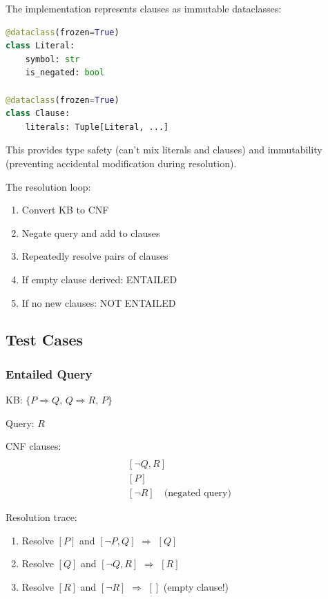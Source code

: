 \documentclass[letterpaper]{article}
\begin{document}
The implementation represents clauses as immutable dataclasses:

\begin{lstlisting}[language=Python]
@dataclass(frozen=True)
class Literal:
    symbol: str
    is_negated: bool

@dataclass(frozen=True)
class Clause:
    literals: Tuple[Literal, ...]
\end{lstlisting}

This provides type safety (can't mix literals and clauses) and immutability (preventing accidental modification during resolution).

The resolution loop:
\begin{enumerate}
\item Convert KB to CNF
\item Negate query and add to clauses
\item Repeatedly resolve pairs of clauses
\item If empty clause derived: ENTAILED
\item If no new clauses: NOT ENTAILED
\end{enumerate}

\subsection{Test Cases}

\subsubsection{Entailed Query}

KB: $\{P \Rightarrow Q, \, Q \Rightarrow R, \, P\}$

Query: $R$

CNF clauses:
\begin{align*}
[\neg P, Q] \\
[\neg Q, R] \\
[P] \\
[\neg R] \quad \text{(negated query)}
\end{align*}

Resolution trace:
\begin{enumerate}
\item Resolve $[P]$ and $[\neg P, Q]$ $\Rightarrow$ $[Q]$
\item Resolve $[Q]$ and $[\neg Q, R]$ $\Rightarrow$ $[R]$
\item Resolve $[R]$ and $[\neg R]$ $\Rightarrow$ $[]$ (empty clause!)
\end{enumerate}
\end{document}
